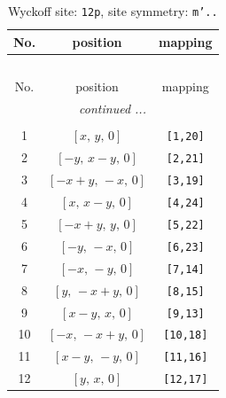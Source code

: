 \documentclass[fleqn,8pt]{jsarticle}
\begin{document}
\begin{longtable}{ccc}
\caption{Wyckoff site: {\tt 12p}, site symmetry: {\tt m'..}}
 \\
 \hline \hline
No. & position & mapping \\ \hline \endfirsthead

\multicolumn{2}{l}{\tablename\ \thetable{}} \\
 \hline \hline
No. & position & mapping \\ \hline \endhead

 \hline \hline
\multicolumn{2}{r}{\footnotesize\it continued ...} \\ \endfoot

 \hline \hline
\multicolumn{2}{r}{} \\ \endlastfoot

1 & $\left[ x,\, y,\, 0 \right]$ & {\tt [1,20]} \\ \hline
2 & $\left[ - y,\, x - y,\, 0 \right]$ & {\tt [2,21]} \\ \hline
3 & $\left[ - x + y,\, - x,\, 0 \right]$ & {\tt [3,19]} \\ \hline
4 & $\left[ x,\, x - y,\, 0 \right]$ & {\tt [4,24]} \\ \hline
5 & $\left[ - x + y,\, y,\, 0 \right]$ & {\tt [5,22]} \\ \hline
6 & $\left[ - y,\, - x,\, 0 \right]$ & {\tt [6,23]} \\ \hline
7 & $\left[ - x,\, - y,\, 0 \right]$ & {\tt [7,14]} \\ \hline
8 & $\left[ y,\, - x + y,\, 0 \right]$ & {\tt [8,15]} \\ \hline
9 & $\left[ x - y,\, x,\, 0 \right]$ & {\tt [9,13]} \\ \hline
10 & $\left[ - x,\, - x + y,\, 0 \right]$ & {\tt [10,18]} \\ \hline
11 & $\left[ x - y,\, - y,\, 0 \right]$ & {\tt [11,16]} \\ \hline
12 & $\left[ y,\, x,\, 0 \right]$ & {\tt [12,17]} \\
\end{longtable}
\renewcommand{\arraystretch}{1.2}
\end{document}
